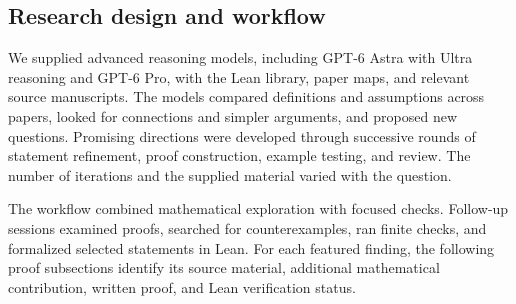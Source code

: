 \subsection{Research design and workflow}
\label{app:research-method}
We supplied advanced reasoning models, including GPT-6 Astra with Ultra
reasoning and GPT-6 Pro, with the Lean library, paper maps, and relevant source
manuscripts. The models compared definitions and assumptions across papers,
looked for connections and simpler arguments, and proposed new questions.
Promising directions were developed through successive rounds of statement
refinement, proof construction, example testing, and review. The number of
iterations and the supplied material varied with the question.

The workflow combined mathematical exploration with focused checks. Follow-up
sessions examined proofs, searched for counterexamples, ran finite checks, and
formalized selected statements in Lean. For each featured finding,
the following proof subsections identify its source material, additional
mathematical contribution, written proof, and Lean verification status.

